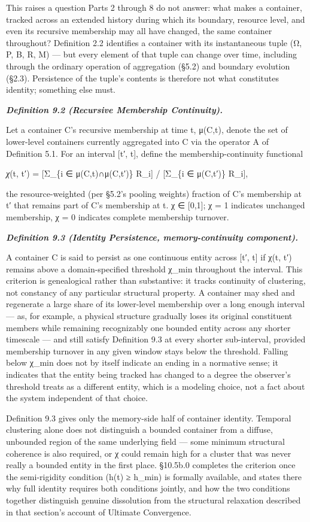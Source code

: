 \documentclass[
]{article}
\begin{document}
This raises a question Parts 2 through 8 do not answer: what makes a
container, tracked across an extended history during which its boundary,
resource level, and even its recursive membership may all have changed,
the same container throughout? Definition 2.2 identifies a container
with its instantaneous tuple (Ω, P, B, R, M) --- but every element of
that tuple can change over time, including through the ordinary
operation of aggregation (§5.2) and boundary evolution (§2.3).
Persistence of the tuple's contents is therefore not what constitutes
identity; something else must.

\emph{\textbf{Definition 9.2 (Recursive Membership Continuity).}}

Let a container C's recursive membership at time t, μ(C,t), denote the
set of lower-level containers currently aggregated into C via the
operator A of Definition 5.1. For an interval {[}t′, t{]}, define the
membership-continuity functional

\emph{χ}(t, t′) = {[}Σ\_\{i ∈ μ(C,t)∩μ(C,t′)\} R\_i{]} / {[}Σ\_\{i ∈
μ(C,t′)\} R\_i{]},

the resource-weighted (per §5.2's pooling weights) fraction of C's
membership at t′ that remains part of C's membership at t. χ ∈
{[}0,1{]}; χ = 1 indicates unchanged membership, χ = 0 indicates
complete membership turnover.

\emph{\textbf{Definition 9.3 (Identity Persistence, memory-continuity
component).}}

A container C is said to persist as one continuous entity across {[}t′,
t{]} if χ(t, t′) remains above a domain-specified threshold χ\_min
throughout the interval. This criterion is genealogical rather than
substantive: it tracks continuity of clustering, not constancy of any
particular structural property. A container may shed and regenerate a
large share of its lower-level membership over a long enough interval
--- as, for example, a physical structure gradually loses its original
constituent members while remaining recognizably one bounded entity
across any shorter timescale --- and still satisfy Definition 9.3 at
every shorter sub-interval, provided membership turnover in any given
window stays below the threshold. Falling below χ\_min does not by
itself indicate an ending in a normative sense; it indicates that the
entity being tracked has changed to a degree the observer's threshold
treats as a different entity, which is a modeling choice, not a fact
about the system independent of that choice.

Definition 9.3 gives only the memory-side half of container identity.
Temporal clustering alone does not distinguish a bounded container from
a diffuse, unbounded region of the same underlying field --- some
minimum structural coherence is also required, or χ could remain high
for a cluster that was never really a bounded entity in the first place.
§10.5b.0 completes the criterion once the semi-rigidity condition (h(t)
≥ h\_min) is formally available, and states there why full identity
requires both conditions jointly, and how the two conditions together
distinguish genuine dissolution from the structural relaxation described
in that section's account of Ultimate Convergence.
\end{document}
